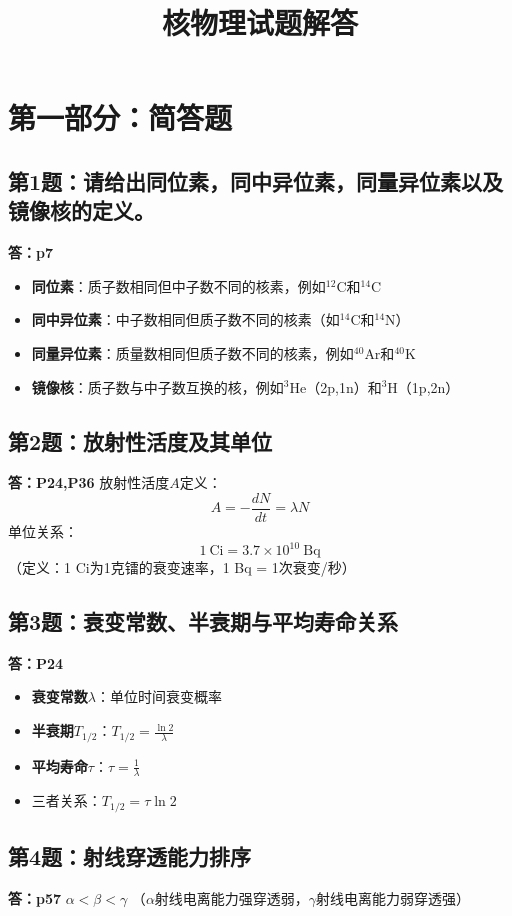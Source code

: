 \documentclass{article}
\title{核物理试题解答}
\author{}
\date{}
\begin{document}
\maketitle

\section*{第一部分：简答题}

\subsection*{第1题：请给出同位素，同中异位素，同量异位素以及镜像核的定义。}
\textbf{答：p7}
\begin{itemize}
  \item \textbf{同位素}：质子数相同但中子数不同的核素，例如$^{12}$C和$^{14}$C
   \item \textbf{同中异位素}：中子数相同但质子数不同的核素（如$^{14}$C和$^{14}$N）
  \item \textbf{同量异位素}：质量数相同但质子数不同的核素，例如$^{40}$Ar和$^{40}$K
  \item \textbf{镜像核}：质子数与中子数互换的核，例如$^{3}$He（2p,1n）和$^{3}$H（1p,2n）
\end{itemize}

\subsection*{第2题：放射性活度及其单位}
\textbf{答：P24,P36}
放射性活度$A$定义：
$$ A = -\frac{dN}{dt} = \lambda N $$
单位关系：
$$ 1\ \mathrm{Ci} = 3.7 \times 10^{10}\ \mathrm{Bq} $$
（定义：1 Ci为1克镭的衰变速率，1 Bq = 1次衰变/秒）

\subsection*{第3题：衰变常数、半衰期与平均寿命关系}
\textbf{答：P24}
\begin{itemize}
  \item \textbf{衰变常数$\lambda$}：单位时间衰变概率
  \item \textbf{半衰期$T_{1/2}$}：$T_{1/2} = \frac{\ln 2}{\lambda}$
  \item \textbf{平均寿命$\tau$}：$\tau = \frac{1}{\lambda}$
  \item 三者关系：$T_{1/2} = \tau \ln 2$
\end{itemize}

\subsection*{第4题：射线穿透能力排序}
\textbf{答：p57} $\alpha < \beta < \gamma$
（$\alpha$射线电离能力强穿透弱，$\gamma$射线电离能力弱穿透强）
\end{document}
